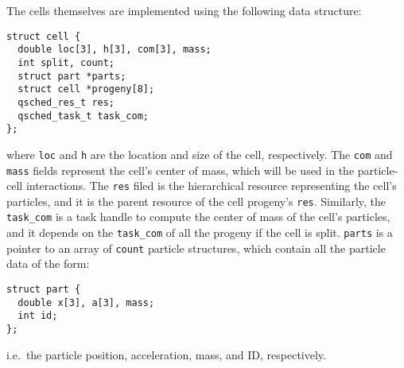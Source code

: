 \documentclass[fleqn,10pt]{wlpeerj}
\begin{document}
The cells themselves are implemented using the following 
data structure:
\begin{center}\begin{minipage}{0.9\textwidth}
    \begin{lstlisting}
struct cell {
  double loc[3], h[3], com[3], mass;
  int split, count;
  struct part *parts;
  struct cell *progeny[8];
  qsched_res_t res;
  qsched_task_t task_com;
};
    \end{lstlisting}
\end{minipage}\end{center}
\noindent where {\tt loc} and {\tt h} are the location
and size of the cell, respectively.
The {\tt com} and {\tt mass} fields represent the cell's
center of mass, which will be used in the particle-cell interactions.
The {\tt res} filed is the hierarchical resource representing
the cell's particles, and it is the parent resource of the cell
progeny's {\tt res}.
Similarly, the {\tt task\_com} is a task handle to
compute the center of mass of the cell's particles, and 
it depends on the {\tt task\_com} of all the progeny if
the cell is split.
{\tt parts} is a pointer to an array of {\tt count} 
particle structures, which contain all the particle
data of the form:
\begin{center}\begin{minipage}{0.9\textwidth}
    \begin{lstlisting}
struct part {
  double x[3], a[3], mass;
  int id;
};
    \end{lstlisting}
\end{minipage}\end{center}
\noindent i.e.~the particle position, acceleration, mass,
and ID, respectively.
\end{document}
